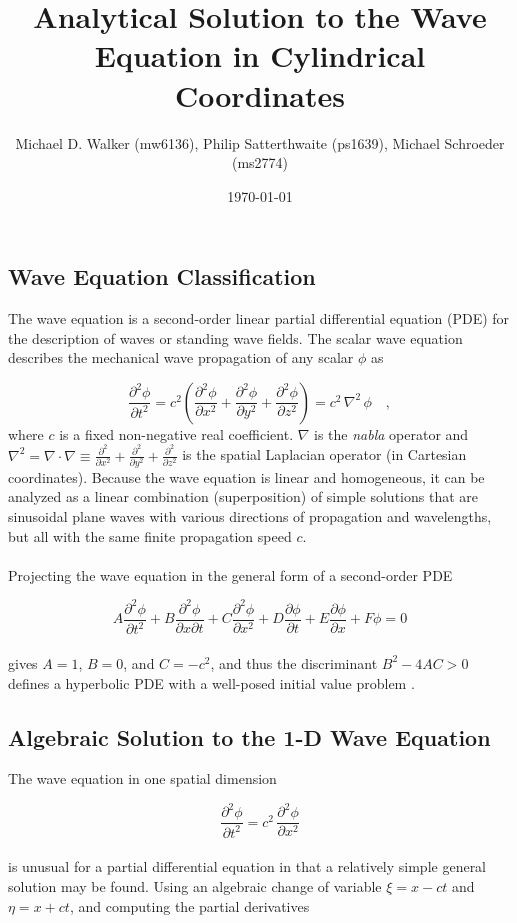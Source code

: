 \documentclass{homework}
\author{Michael D. Walker (mw6136), Philip Satterthwaite (ps1639), Michael Schroeder (ms2774)}
\date{\today}
\title{Analytical Solution to the Wave Equation in Cylindrical Coordinates}
\begin{document}
 \maketitle
\subsection{Wave Equation Classification}
The wave equation is a second-order linear partial differential equation (PDE) for the description of waves or standing wave fields. The scalar wave equation describes the mechanical wave propagation of any scalar $\phi$ as 

\[ \frac{\partial^2 \phi}{\partial t^2} = c^2 \left(\frac{\partial^2 \phi}{\partial x^2} + \frac{\partial^2 \phi}{\partial y^2} + \frac{\partial^2 \phi}{\partial z^2}  \right) = c^2 \,\nabla^2 \, \phi \quad ,\]
\noindent
where $c$ is a fixed non-negative real coefficient. $\nabla$ is the \emph{nabla} operator and $\nabla^2 = \nabla \cdot \nabla \equiv \frac{\partial^2}{\partial x^2} + \frac{\partial^2}{\partial y^2} + \frac{\partial^2}{\partial z^2}$ is the spatial Laplacian operator (in Cartesian coordinates). Because the wave equation is linear and homogeneous, it can be analyzed as a linear combination (superposition) of simple solutions that are sinusoidal plane waves with various directions of propagation and wavelengths, but all with the same finite propagation speed $c$. 
\\ \\ \noindent
Projecting the wave equation in the general form of a second-order PDE

\[ A \frac{\partial^2 \phi}{\partial t^2} + B \frac{\partial^2 \phi}{\partial x \partial t} + C \frac{\partial^2 \phi}{\partial x^2} + D \frac{\partial \phi}{\partial t} + E \frac{\partial \phi}{\partial x} + F \phi = 0 \]
\\ \noindent
gives $A = 1$, $B = 0$, and $C = -c^2$, and thus the discriminant $B^2 - 4AC > 0$ defines a hyperbolic PDE with a well-posed initial value problem .

\newpage
\subsection{Algebraic Solution to the 1-D Wave Equation}
The wave equation in one spatial dimension

\[ \frac{\partial^2 \phi}{\partial t^2} = c^2 \, \frac{\partial^2 \phi}{\partial x^2} \]
\\ \noindent
is unusual for a partial differential equation in that a relatively simple general solution may be found. Using an algebraic change of variable $\xi = x - ct$ and  $\eta = x + ct$, and computing the partial derivatives
\end{document}
